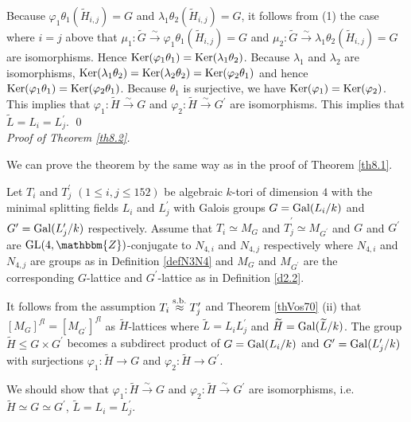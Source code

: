 \documentclass{amsart}
\theoremstyle{plain}
\theoremstyle{definition}
\theoremstyle{remark}
\newcommand{\bZ}{\mathbbm{Z}}\newcommand{\bQ}{\mathbbm{Q}}
\newcommand{\GL}{{\rm GL}}\newcommand{\SL}{{\rm SL}}
\newcounter{sub}\def\tr{\mbox{tr }}
\begin{document}
{Because $\varphi_1\theta_1(\widetilde{H}_{i,j})=G$ 
and $\lambda_1\theta_2(\widetilde{H}_{i,j})=G$, 
it follows from (1) the case where $i=j$ above that 
$\mu_1: \widetilde{G}\xrightarrow{\sim} \varphi_1\theta_1(\widetilde{H}_{i,j})=G$ 
and 
$\mu_2: \widetilde{G}\xrightarrow{\sim} \lambda_1\theta_2(\widetilde{H}_{i,j})=G$ are isomorphisms. 
Hence 
${\rm Ker}(\varphi_1\theta_1)
={\rm Ker}(\lambda_1\theta_2)$. 
Because $\lambda_1$ and $\lambda_2$ are isomorphisms, 
${\rm Ker}(\lambda_1\theta_2)=
{\rm Ker}(\lambda_2\theta_2)=
{\rm Ker}(\varphi_2\theta_1)$ 
and hence ${\rm Ker}(\varphi_1\theta_1)=
{\rm Ker}(\varphi_2\theta_1)$. 
Because $\theta_1$ is surjective, 
we have 
${\rm Ker}(\varphi_1)={\rm Ker}(\varphi_2)$. 
This implies that 
$\varphi_1:\widetilde{H}\xrightarrow{\sim} G$ and 
$\varphi_2:\widetilde{H}\xrightarrow{\sim} G^\prime$ 
are isomorphisms. 
This implies that $\widetilde{L}=L_i=L_j^\prime$. 
\qed\\ 

{\it Proof of Theorem \ref{th8.2}.} 

We can prove the theorem by the same way as 
in the proof of Theorem \ref{th8.1}. 

Let $T_i$ and $T_j^\prime$ $(1\leq i,j\leq 152)$ 
be algebraic $k$-tori of dimension $4$ with the minimal splitting fields 
$L_i$ and $L_j^\prime$ 
with Galois groups 
$G={\rm Gal}(L_i/k)$ and $G^\prime={\rm Gal}(L_j^\prime/k)$ respectively. 
Assume that 
$\widehat{T}_i\simeq M_G$ and $\widehat{T}^\prime_j\simeq M_{G^\prime}$
and $G$ and $G^\prime$ are 
$\GL(4,\bZ)$-conjugate to $N_{4,i}$ and $N_{4,j}$ respectively 
where $N_{4,i}$ and $N_{4,j}$ are groups as in Definition \ref{defN3N4} 
and $M_G$ and $M_{G^\prime} $ are the corresponding $G$-lattice 
and $G^\prime$-lattice as in Definition \ref{d2.2}. 

It follows from the assumption $T_i\stackrel{\rm s.b.}{\approx} T_j^\prime$ 
and Theorem \ref{thVos70} (ii) that 
$[M_G]^{fl}=[M_{G^\prime}]^{fl}$ as $\widetilde{H}$-lattices where 
$\widetilde{L}=L_iL_j^\prime$ 
and $\widetilde{H}={\rm Gal}(\widetilde{L}/k)$. 
The group $\widetilde{H}\leq G\times G^\prime$ becomes a 
subdirect product of $G={\rm Gal}(L_i/k)$ and 
$G^\prime={\rm Gal}(L^\prime_j/k)$ with 
surjections $\varphi_1:\widetilde{H}\rightarrow G$ and 
$\varphi_2:\widetilde{H}\rightarrow G^\prime$. 

We should show that 
$\varphi_1:\widetilde{H}\xrightarrow{\sim} G$ and 
$\varphi_2:\widetilde{H}\xrightarrow{\sim} G^\prime$ 
are isomorphisms, i.e. $\widetilde{H}\simeq G\simeq G^\prime$, 
$\widetilde{L}=L_i=L_j^\prime$.\\

}
\end{document}
